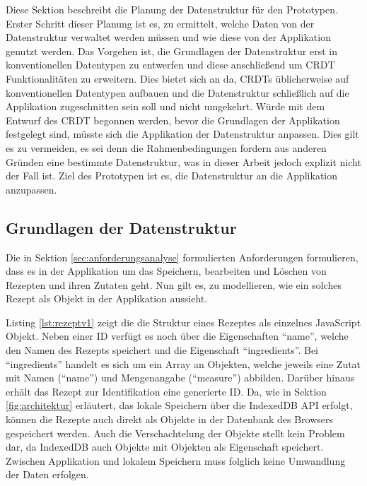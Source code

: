 \documentclass[a4paper, 12pt]{scrreprt}
\begin{document}
Diese Sektion beschreibt die Planung der Datenstruktur für den Prototypen. Erster Schritt dieser Planung ist es, zu ermittelt, welche Daten von der Datenstruktur verwaltet werden müssen und wie diese von der Applikation genutzt werden. Das Vorgehen ist, die Grundlagen der Datenstruktur erst in konventionellen Datentypen zu entwerfen und diese anschließend um CRDT Funktionalitäten zu erweitern. Dies bietet sich an da, CRDTs üblicherweise auf konventionellen Datentypen aufbauen und die Datenstruktur schließlich auf die Applikation zugeschnitten sein soll und nicht umgekehrt. Würde mit dem Entwurf des CRDT begonnen werden, bevor die Grundlagen der Applikation festgelegt sind, müsste sich die Applikation der Datenstruktur anpassen. Dies gilt es zu vermeiden, es sei denn die Rahmenbedingungen fordern aus anderen Gründen eine bestimmte Datenstruktur, was in dieser Arbeit jedoch explizit nicht der Fall ist. Ziel des Prototypen ist es, die Datenstruktur an die Applikation anzupassen. 

\subsection{Grundlagen der Datenstruktur}

Die in Sektion \ref{sec:anforderungsanalyse} formulierten Anforderungen formulieren, dass es in der Applikation um das Speichern, bearbeiten und Löschen von Rezepten und ihren Zutaten geht. Nun gilt es, zu modellieren, wie ein solches Rezept als Objekt in der Applikation aussieht. 

Listing \ref{lst:rezeptv1} zeigt die die Struktur eines Rezeptes als einzelnes JavaScript Objekt. Neben einer ID verfügt es noch über die Eigenschaften \enquote{name}, welche den Namen des Rezepts speichert und die Eigenschaft \enquote{ingredients}. Bei \enquote{ingredients} handelt es sich um ein Array an Objekten, welche jeweils eine Zutat mit Namen (\enquote{name}) und Mengenangabe (\enquote{measure}) abbilden. Darüber hinaus erhält das Rezept zur Identifikation eine generierte ID. Da, wie in Sektion \ref{fig:architektur} erläutert, das lokale Speichern über die IndexedDB API erfolgt, können die Rezepte auch direkt als Objekte in der Datenbank des Browsers gespeichert werden. Auch die Verschachtelung der Objekte stellt kein Problem dar, da IndexedDB auch Objekte mit Objekten als Eigenschaft speichert. Zwischen Applikation und lokalem Speichern muss folglich keine Umwandlung der Daten erfolgen.

\end{document}
